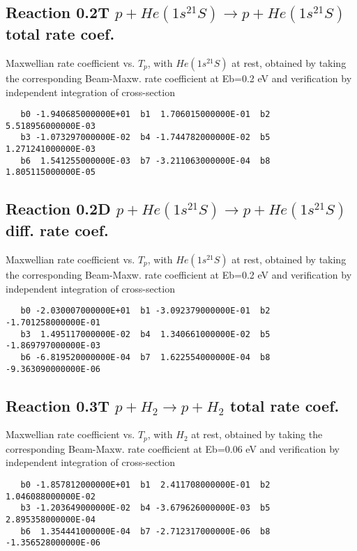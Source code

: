 \documentclass[12pt,dvipdfmx]{article}
\begin{document}
\subsection{
Reaction 0.2T  $p + He(1s^21S) \rightarrow p + He(1s^21S)$ total rate coef.
}
Maxwellian rate coefficient vs. $T_p$, with $He(1s^21S)$ at rest, obtained by taking
the corresponding Beam-Maxw. rate coefficient at Eb=0.2 eV and
verification by independent integration of cross-section
\begin{small}\begin{verbatim}
   b0 -1.940685000000E+01  b1  1.706015000000E-01  b2  5.518956000000E-03
   b3 -1.073297000000E-02  b4 -1.744782000000E-02  b5  1.271241000000E-03
   b6  1.541255000000E-03  b7 -3.211063000000E-04  b8  1.805115000000E-05
\end{verbatim}\end{small}


\subsection{
Reaction 0.2D  $p + He(1s^21S) \rightarrow p + He(1s^21S)$ diff. rate coef.
}
Maxwellian rate coefficient vs. $T_p$, with $He(1s^21S)$ at rest, obtained by taking
the corresponding Beam-Maxw. rate coefficient at Eb=0.2 eV and
verification by independent integration of cross-section
\begin{small}\begin{verbatim}
   b0 -2.030007000000E+01  b1 -3.092379000000E-01  b2 -1.701258000000E-01
   b3  1.495117000000E-02  b4  1.340661000000E-02  b5 -1.869797000000E-03
   b6 -6.819520000000E-04  b7  1.622554000000E-04  b8 -9.363090000000E-06
\end{verbatim}\end{small}


\subsection{
Reaction 0.3T  $p + H_2 \rightarrow p + H_2$ total rate coef.
}
Maxwellian rate coefficient vs. $T_p$, with $H_2$ at rest, obtained by taking
the corresponding Beam-Maxw. rate coefficient at Eb=0.06 eV and
verification by independent integration of cross-section
\begin{small}\begin{verbatim}
   b0 -1.857812000000E+01  b1  2.411708000000E-01  b2  1.046088000000E-02
   b3 -1.203649000000E-02  b4 -3.679626000000E-03  b5  2.895358000000E-04
   b6  1.354441000000E-04  b7 -2.712317000000E-06  b8 -1.356528000000E-06
\end{verbatim}\end{small}
\end{document}
